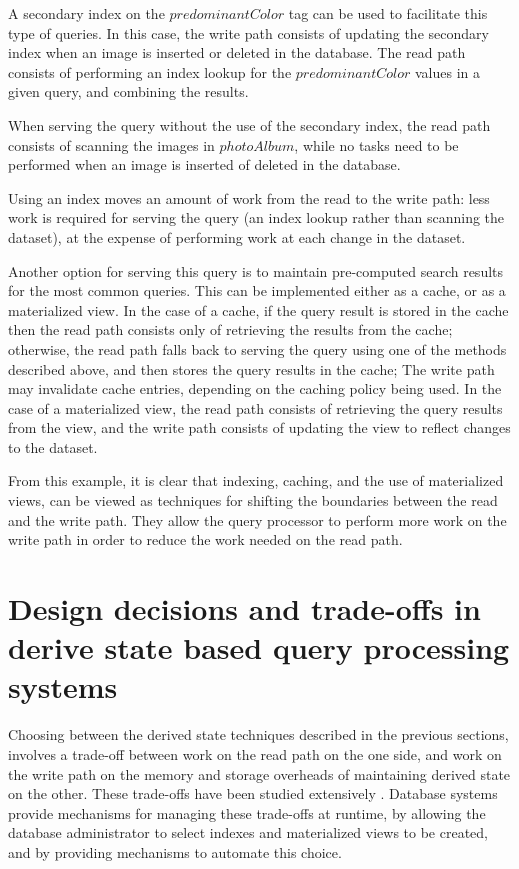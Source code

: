 A secondary index on the $predominantColor$ tag can be used to facilitate this type of queries.
In this case, the write path consists of updating the secondary index when an image is inserted or deleted in the database.
The read path consists of performing an index lookup for the $predominantColor$ values in a given query,
and combining the results.

When serving the query without the use of the secondary index, the read path consists of scanning the images in $photoAlbum$,
while no tasks need to be performed when an image is inserted of deleted in the database.

Using an index moves an amount of work from the read to the write path:
less work is required for serving the query (an index lookup rather than scanning the dataset), at the expense of performing
work at each change in the dataset.

Another option for serving this query is to maintain pre-computed search results for the most common queries.
This can be implemented either as a cache, or as a materialized view.
In the case of a cache, if the query result is stored in the cache then the read path consists only of retrieving the
results from the cache;
otherwise, the read path falls back to serving the query using one of the methods described above,
and then stores the query results in the cache;
The write path may invalidate cache entries, depending on the caching policy being used.
In the case of a materialized view, the read path consists of retrieving the query results from the view,
and the write path consists of updating the view to reflect changes to the dataset.

From this example, it is clear that indexing, caching, and the use of materialized views,
can be viewed as techniques for shifting the boundaries between the read and the write path.
They allow the query processor to perform more work on the write path in order to reduce the work needed on the read path.


\section{Design decisions and trade-offs in derive state based query processing systems}

Choosing between the derived state techniques described in the previous sections,
involves a trade-off between work on the read path on the one side,
and work on the write path on the memory and storage overheads of maintaining derived state on the other.
These trade-offs have been studied extensively \cite{valentin:db2advisor, chaudhuri:decadeselftuning}.
Database systems provide mechanisms for managing these trade-offs at runtime, by allowing the database administrator
to select indexes and materialized views to be created, and by providing mechanisms to automate this choice.

